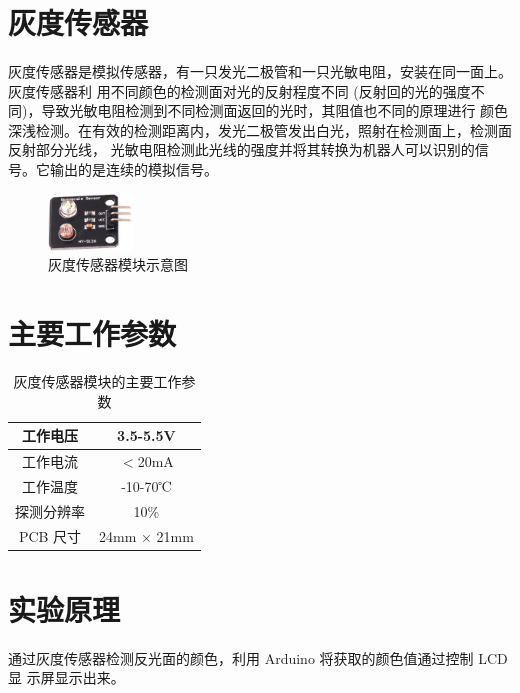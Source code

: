 \documentclass[UTF8, oneside]{ctexbook}
\begin{document}
\section{灰度传感器}
\paragraph{}
灰度传感器是模拟传感器，有一只发光二极管和一只光敏电阻，安装在同一面上。灰度传感器利
用不同颜色的检测面对光的反射程度不同 (反射回的光的强度不同)，导致光敏电阻检测到不同检测面返回的光时，其阻值也不同的原理进行
颜色深浅检测。在有效的检测距离内，发光二极管发出白光，照射在检测面上，检测面反射部分光线，
光敏电阻检测此光线的强度并将其转换为机器人可以识别的信号。它输出的是连续的模拟信号。
\begin{figure}[h]
    \centering
    \includegraphics[width=0.2\textwidth]{./result/sensor/6/sensor.png}
    \caption{灰度传感器模块示意图}
    \label{6_sensor}
\end{figure}

\section{主要工作参数}
\begin{table}[h]
    \centering
    \begin{tabular}{|c|c|}
    \hline
    工作电压   & 3.5-5.5V  \\ \hline
    工作电流   & $<$20mA     \\ \hline
    工作温度 & -10-70℃ \\ \hline
    探测分辨率 & 10\%     \\ \hline
    PCB 尺寸  &  24mm $\times$ 21mm    \\ \hline
    \end{tabular}
    \caption{灰度传感器模块的主要工作参数}
\end{table}

\section{实验原理}
\paragraph{}
通过灰度传感器检测反光面的颜色，利用 Arduino 将获取的颜色值通过控制 LCD 显
示屏显示出来。
\end{document}
